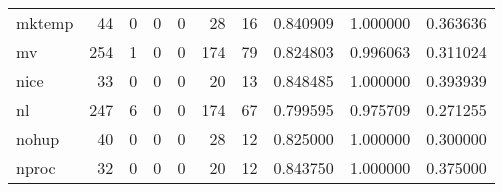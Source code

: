 \begin{tabular}{lrrrrrrrrr}
mktemp    &                                        44 &                                                  0 &                                                  0 &                                                  0 &                                                 28 &                                                 16 &                                           0.840909 &                               1.000000 &                             0.363636 \\
mv        &                                       254 &                                                  1 &                                                  0 &                                                  0 &                                                174 &                                                 79 &                                           0.824803 &                               0.996063 &                             0.311024 \\
nice      &                                        33 &                                                  0 &                                                  0 &                                                  0 &                                                 20 &                                                 13 &                                           0.848485 &                               1.000000 &                             0.393939 \\
nl        &                                       247 &                                                  6 &                                                  0 &                                                  0 &                                                174 &                                                 67 &                                           0.799595 &                               0.975709 &                             0.271255 \\
nohup     &                                        40 &                                                  0 &                                                  0 &                                                  0 &                                                 28 &                                                 12 &                                           0.825000 &                               1.000000 &                             0.300000 \\
nproc     &                                        32 &                                                  0 &                                                  0 &                                                  0 &                                                 20 &                                                 12 &                                           0.843750 &                               1.000000 &                             0.375000 \\

\end{tabular}
